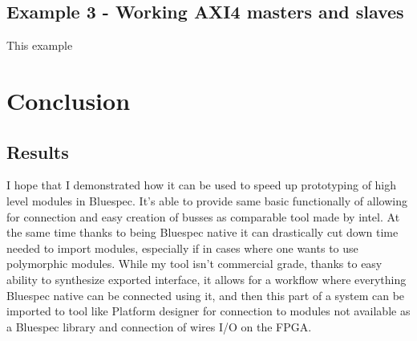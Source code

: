 \documentclass[12pt]{report}
\begin{document}
\section{Example 3 - Working AXI4 masters and slaves}
This example 

\chapter{Conclusion}
\section{Results}
I hope that I demonstrated how it can be used to speed up prototyping of high level modules in Bluespec. It's able to provide same basic functionally of allowing for connection and easy creation of busses as comparable tool made by intel. At the same time thanks to being Bluespec native it can drastically cut down time needed to import modules, especially if in cases where one wants to use polymorphic modules. While my tool isn't commercial grade, thanks to easy ability to synthesize exported interface, it allows for a workflow where everything Bluespec native can be connected using it, and then this part of a system can be imported to tool like Platform designer for connection to modules not available as a Bluespec library and connection of wires I/O on the FPGA.
\end{document}
